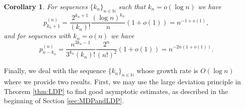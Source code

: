 \documentclass[11pt,a4paper]{article}
\numberwithin{equation}{section}
\newtheorem {corollary}[theorem]{Corollary}
\def\NN{\mathbb{N}}
\begin{document}
\begin{corollary}\label{cor:probab}
    For sequences $\{k_n\}_{n\in\NN}$ such that $k_n=o(\log n)$ we have
    \begin{equation*}
        p_{k_n+1}^{(n)} = \frac{2^{k_n+1}}{(k_n)!} \frac{(\log n)^{k_n}}{n} (1+o(1)) = n^{-1+o(1)},
    \end{equation*}
    and for sequences with $k_n=o(n)$ we have
    \begin{equation*}
        p_{n-k_n}^{(n)} = \frac{n^{3k_n-1}}{3^{k_n} (k_n)!} \frac{2^n}{(n!)^2} (1+o(1)) = n^{-2n(1+o(1))}.
    \end{equation*}
\end{corollary}

Finally, we deal with the sequence $\{k_n\}_{n\in\NN}$ whose growth rate is $O(\log n)$ where we provide two results. First, we may use the large deviation principle in Theorem \ref{thm:LDP} to find good asymptotic estimates, as described in the beginning of Section \ref{sec:MDPandLDP}.
\end{document}
